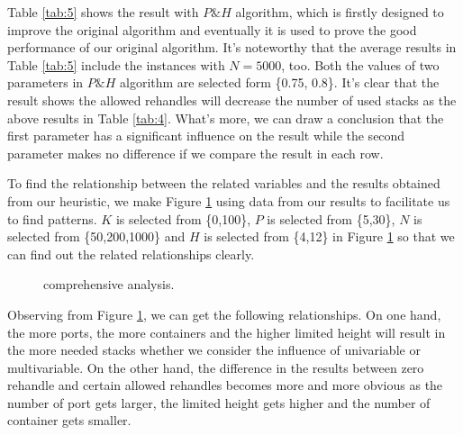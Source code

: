 \documentclass[review,3p,times,authoryear,12pt]{elsarticle}
\begin{document}
Table \ref{tab:5} shows the result with $P\&H$ algorithm, which is firstly designed to improve the original algorithm and eventually it is used to prove the good performance of our original algorithm.
It's noteworthy that the average results in Table \ref{tab:5} include the instances with $N=5000$, too.
Both the values of two parameters in $P\&H$ algorithm are selected form \{0.75, 0.8\}.
It's clear that the result shows the allowed rehandles will decrease the number of used stacks as the above results in Table \ref{tab:4}.
What's more, we can draw a conclusion that the first parameter has a significant influence on the result while the second parameter makes no difference if we compare the result in each row.

To find the relationship between the related variables and the results obtained from our heuristic, we make Figure \ref{fig 5:graph} using data from our results to facilitate us to find patterns.
$K$ is selected from \{0,100\}, $P$ is selected from \{5,30\}, $N$ is selected from \{50,200,1000\} and $H$ is selected from \{4,12\} in Figure \ref{fig 5:graph} so that we can find out the related relationships clearly.

\begin{figure}[htbp]
\centering
\setlength{\abovecaptionskip}{10pt}
\caption{comprehensive analysis.}
\label{fig 5:graph}
\end{figure}

Observing from Figure \ref{fig 5:graph}, we can get the following relationships.
On one hand, the more ports, the more containers and the higher limited height will result in the more needed stacks whether we consider the influence of univariable or multivariable.
On the other hand, the difference in the results between zero rehandle and certain allowed rehandles becomes more and more obvious as the number of port gets larger, the limited height gets higher and the number of container gets smaller.
\end{document}
